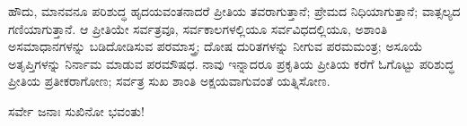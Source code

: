 ಹೌದು, ಮಾನವನೂ ಪರಿಶುದ್ಧ ಹೃದಯವಂತನಾದರೆ ಪ್ರೀತಿಯ ತವರಾಗುತ್ತಾನೆ; ಪ್ರೇಮದ ನಿಧಿಯಾಗುತ್ತಾನೆ; ವಾತ್ಸಲ್ಯದ ಗಣಿಯಾಗುತ್ತಾನೆ. ಆ ಪ್ರೀತಿಯೇ ಸರ್ವತ್ರವೂ, ಸರ್ವಕಾಲ\-ಗಳಲ್ಲಿಯೂ ಸರ್ವವಿಧದಲ್ಲಿಯೂ, ಅಶಾಂತಿ ಅಸಮಾಧಾನಗಳನ್ನು ಬಡಿದೋಡಿಸುವ ಪರಮಾಸ್ತ್ರ; ದೋಷ ದುರಿತಗಳನ್ನು ನೀಗುವ ಪರಮಮಂತ್ರ; ಅಸೂಯೆ ಅತೃಪ್ತಿಗಳನ್ನು ನಿರ್ನಾಮ ಮಾಡುವ ಪರಮೌಷಧ. ನಾವು ಇನ್ನಾದರೂ ಪ್ರಕೃತಿಯ ಪ್ರೀತಿಯ ಕರೆಗೆ ಓಗೊಟ್ಟು ಪರಿಶುದ್ಧ ಪ್ರೀತಿಯ ಪ್ರತೀಕರಾಗೋಣ; ಸರ್ವತ್ರ ಸುಖ ಶಾಂತಿ ಅಕ್ಷಯವಾಗುವಂತೆ ಯತ್ನಿಸೋಣ.

\begin{center}
ಸರ್ವೇ ಜನಾಃ ಸುಖಿನೋ ಭವಂತು!
\end{center}

\chapterend


